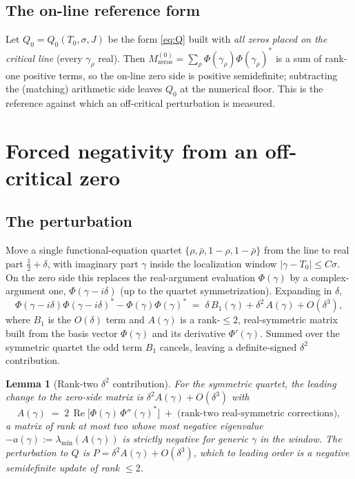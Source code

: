 \documentclass[11pt]{amsart}
\newtheorem{lemma}[theorem]{Lemma}
\theoremstyle{definition}
\theoremstyle{remark}
\newcommand{\re}{\operatorname{Re}}
\newcommand{\lmin}{\lambda_{\min}}
\newcommand{\Qzero}{Q_{0}}
\begin{document}
\subsection{The on-line reference form}

Let $\Qzero=\Qzero(T_0,\sigma,J)$ be the form \eqref{eq:Q} built with
\emph{all zeros placed on the critical line} (every $\gamma_\rho$ real). Then
$M_{\mathrm{zeros}}^{(0)}=\sum_\rho\Phi(\gamma_\rho)\Phi(\gamma_\rho)^*$ is a
sum of rank-one positive terms, so the on-line zero side is positive
semidefinite; subtracting the (matching) arithmetic side leaves $\Qzero$ at
the numerical floor. This is the reference against which an off-critical
perturbation is measured.

\section{Forced negativity from an off-critical zero}\label{sec:forced}

\subsection{The perturbation}

Move a single functional-equation quartet
$\{\rho,\bar\rho,1-\rho,1-\bar\rho\}$ from the line to real part
$\tfrac12+\delta$, with imaginary part $\gamma$ inside the localization
window $|\gamma-T_0|\le C\sigma$. On the zero side this replaces the
real-argument evaluation $\Phi(\gamma)$ by a complex-argument one,
$\Phi(\gamma-i\delta)$ (up to the quartet symmetrization). Expanding in
$\delta$,
\begin{equation}\label{eq:taylor}
  \Phi(\gamma-i\delta)\Phi(\gamma-i\delta)^{*}
  -\Phi(\gamma)\Phi(\gamma)^{*}
  \;=\; \delta\,B_1(\gamma) + \delta^2\,A(\gamma) + O(\delta^3),
\end{equation}
where $B_1$ is the $O(\delta)$ term and $A(\gamma)$ is a rank-$\le2$,
real-symmetric matrix built from the basis vector $\Phi(\gamma)$ and its
derivative $\Phi'(\gamma)$. Summed over the symmetric quartet the odd term
$B_1$ cancels, leaving a definite-signed $\delta^2$ contribution.

\begin{lemma}[Rank-two $\delta^2$ contribution]\label{lem:rank2}
For the symmetric quartet, the leading change to the zero-side matrix is
$\delta^2 A(\gamma)+O(\delta^3)$ with
\[
  A(\gamma) \;=\; 2\,\re\!\bigl[\Phi(\gamma)\,\Phi''(\gamma)^{*}\bigr]
  \;+\; \text{(rank-two real-symmetric corrections)},
\]
a matrix of rank at most two whose most negative eigenvalue
$-a(\gamma):=\lmin(A(\gamma))$ is strictly negative for generic $\gamma$ in
the window. The perturbation to $Q$ is $P=\delta^2A(\gamma)+O(\delta^3)$,
which to leading order is a negative semidefinite update of rank $\le2$.
\end{lemma}
\end{document}
